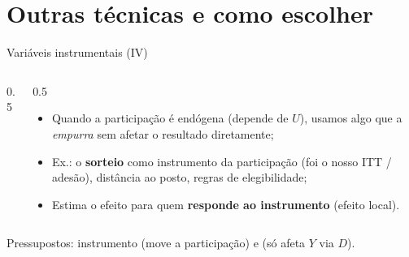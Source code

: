 \section[Outras]{Outras técnicas e como escolher}

\begin{frame}{Variáveis instrumentais (IV)}
  \begin{columns}[T]
    \begin{column}{0.5\textwidth}
    \end{column}
    \begin{column}{0.5\textwidth}
      \footnotesize
      \begin{itemize}
        \item Quando a participação é \alert{endógena} (depende de $U$), usamos algo que a \emph{empurra} sem afetar o resultado diretamente;
        \item Ex.: o \textbf{sorteio} como instrumento da participação (foi o nosso ITT / adesão), distância ao posto, regras de elegibilidade;
        \item Estima o efeito para quem \textbf{responde ao instrumento} (efeito local).
      \end{itemize}
    \end{column}
  \end{columns}
  \vspace{0.3cm}
  \small Pressupostos: instrumento  (move a participação) e  (só afeta $Y$ via $D$).
\end{frame}

